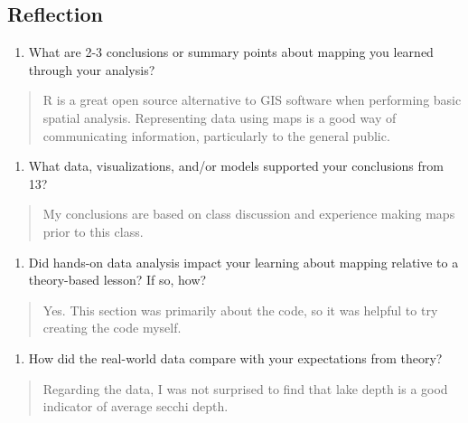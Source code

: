 \documentclass[]{article}
\providecommand{\tightlist}{%
  \setlength{\itemsep}{0pt}\setlength{\parskip}{0pt}}
\begin{document}
\hypertarget{reflection}{%
\subsection{Reflection}\label{reflection}}

\begin{enumerate}
\def\labelenumi{\arabic{enumi}.}
\setcounter{enumi}{12}
\tightlist
\item
  What are 2-3 conclusions or summary points about mapping you learned
  through your analysis?
\end{enumerate}

\begin{quote}
R is a great open source alternative to GIS software when performing
basic spatial analysis. Representing data using maps is a good way of
communicating information, particularly to the general public.
\end{quote}

\begin{enumerate}
\def\labelenumi{\arabic{enumi}.}
\setcounter{enumi}{13}
\tightlist
\item
  What data, visualizations, and/or models supported your conclusions
  from 13?
\end{enumerate}

\begin{quote}
My conclusions are based on class discussion and experience making maps
prior to this class.
\end{quote}

\begin{enumerate}
\def\labelenumi{\arabic{enumi}.}
\setcounter{enumi}{14}
\tightlist
\item
  Did hands-on data analysis impact your learning about mapping relative
  to a theory-based lesson? If so, how?
\end{enumerate}

\begin{quote}
Yes. This section was primarily about the code, so it was helpful to try
creating the code myself.
\end{quote}

\begin{enumerate}
\def\labelenumi{\arabic{enumi}.}
\setcounter{enumi}{15}
\tightlist
\item
  How did the real-world data compare with your expectations from
  theory?
\end{enumerate}

\begin{quote}
Regarding the data, I was not surprised to find that lake depth is a
good indicator of average secchi depth.
\end{quote}
\end{document}
